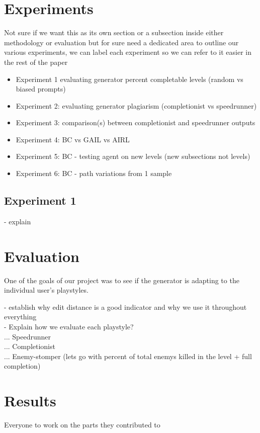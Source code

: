 \documentclass[letterpaper]{article} %
\begin{document}
\section{Experiments}
Not sure if we want this as its own section or a subsection inside either methodology or evaluation but for sure need a dedicated area to outline our various experiments, we can label each experiment so we can refer to it easier in the rest of the paper
\begin{itemize}
    \item Experiment 1 evaluating generator percent completable levels (random vs biased prompts)
    \item Experiment 2: evaluating generator plagiarism (completionist vs speedrunner)
    \item Experiment 3: comparison(s) between completionist and speedrunner outputs
    \item Experiment 4: BC vs GAIL vs AIRL
    \item Experiment 5: BC - testing agent on new levels (new subsections not levels)
    \item Experiment 6: BC - path variations from 1 sample
\end{itemize}

\subsection{Experiment 1}
- explain


\section{Evaluation}
One of the goals of our project was to see if the generator is adapting to the individual user's playstyles. 

- establish why edit distance is a good indicator and why we use it throughout everything\\
- Explain how we evaluate each playstyle?\\
... Speedrunner\\
... Completionist\\
... Enemy-stomper (lets go with percent of total enemys killed in the level + full completion)\\

\section{Results}
Everyone to work on the parts they contributed to 
\end{document}
